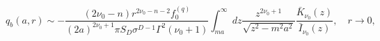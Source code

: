 \begin{equation}\label{compatcentre}
  q_b(a,r)\sim -\frac{(2\nu _0-n)r^{2\nu _0-n-2}f^{(q)}_{0}}{
  (2a)^{2\nu _0+1}\pi S_D\sigma ^{D-1}\Gamma ^2(\nu _0+1)}
  \int _{ma}^{\infty }dz \frac{z^{2\nu _0+1}}{\sqrt{z^2-m^2a^2}}
  \frac{\bar K_{\nu _0}(z)}{
  \bar I_{\nu _0}(z)},\quad r\to 0,
\end{equation}

